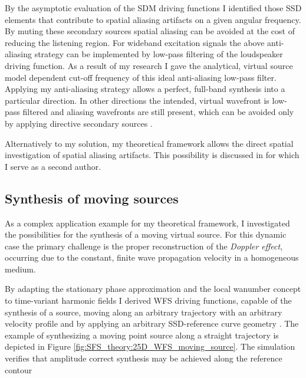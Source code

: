 \documentclass[10pt,twoside]{article}
\theoremstyle{thesisgroupstyle}
\theoremstyle{indented}
\begin{document}
By the asymptotic evaluation of the SDM driving functions I identified those SSD elements that contribute to spatial aliasing artifacts on a given angular frequency.
By muting these secondary sources spatial aliasing can be avoided at the cost of reducing the listening region.
For wideband excitation signals the above anti-aliasing strategy can be implemented by low-pass filtering of the loudspeaker driving function.
As a result of my research I gave the analytical, virtual source model dependent cut-off frequency of this ideal anti-aliasing low-pass filter.
Applying my anti-aliasing strategy allows a perfect, full-band synthesis into a particular direction.
In other directions the intended, virtual wavefront is low-pass filtered and aliasing wavefronts are still present, which can be avoided only by applying directive secondary sources \cite{Firtha2018_daga_a_booklet, Firtha2012:isma_booklet}.

Alternatively to my solution, my theoretical framework allows the direct spatial investigation of spatial aliasing artifacts.
This possibility is discussed in \cite{Winter2019:aliasing} for which I serve as a second author.

\subsection{Synthesis of moving sources}

As a complex application example for my theoretical framework, I investigated the possibilities for the synthesis of a moving virtual source.
For this dynamic case the primary challenge is the proper reconstruction of the \emph{Doppler effect}, occurring due to the constant, finite wave propagation velocity in a homogeneous medium.

By adapting the stationary phase approximation and the local wanumber concept to time-variant harmonic fields I derived WFS driving functions, capable of the synthesis of a source, moving along an arbitrary trajectory with an arbitrary velocity profile and by applying an arbitrary SSD-reference curve geometry \cite{firtha2016wave_booklet, doi:10.1121/1.4996126_booklet, Firtha2015:daga_booklet}.
The example of synthesizing a moving point source along a straight trajectory is depicted in Figure \ref{fig:SFS_theory:25D_WFS_moving_source}.
The simulation verifies that amplitude correct synthesis may be achieved along the reference contour
\end{document}
